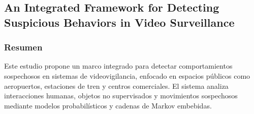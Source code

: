 \subsection{An Integrated Framework for Detecting Suspicious Behaviors in Video Surveillance}

\subsubsection{Resumen}
Este estudio propone un marco integrado para detectar comportamientos sospechosos en sistemas de videovigilancia, enfocado en espacios públicos como aeropuertos, estaciones de tren y centros comerciales. El sistema analiza interacciones humanas, objetos no supervisados y movimientos sospechosos mediante modelos probabilísticos y cadenas de Markov embebidas.


